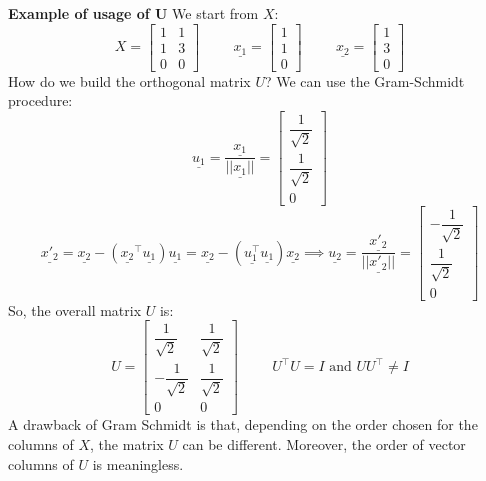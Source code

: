 \textbf{Example of usage of U}
We start from $X$:
\[
    X= \begin{bmatrix}
        1& 1 \\
        1 & 3\\
        0 & 0
    \end{bmatrix}
    \hspace{1cm}
    \underline{x_1} = \begin{bmatrix}
        1\\
        1\\
        0   
    \end{bmatrix}
    \hspace{1cm}
    \underline{x_2} = \begin{bmatrix}
        1\\
        3\\
        0
    \end{bmatrix}
\]
How do we build the orthogonal matrix $U$? We can use the Gram-Schmidt procedure:
\[
    \underline{u_1} = \dfrac{\underline{x_1}}{||\underline{x_1}||} = \begin{bmatrix}
        \dfrac{1}{\sqrt{2}}\\
        \dfrac{1}{\sqrt{2}}\\
        0
    \end{bmatrix}    
\]
\[
    \underline{{x'}_2} = \underline{x_2} - (\underline{x_2}^\intercal \underline{u_1})\underline{u_1} = \underline{x_2} - (\underline{u_1^\intercal} \underline{u_1})\underline{x_2} \implies 
    \underline{u_2} = \dfrac{\underline{{x'}_2}}{||\underline{{x'}_2}||} 
    = \begin{bmatrix}
        -\dfrac{1}{\sqrt{2}}\\
        \dfrac{1}{\sqrt{2}}\\
        0
    \end{bmatrix}    
\]
So, the overall matrix $U$ is:
\[
    U = \begin{bmatrix}
        \dfrac{1}{\sqrt{2}} & \dfrac{1}{\sqrt{2}}\\
        -\dfrac{1}{\sqrt{2}} & \dfrac{1}{\sqrt{2}}\\
        0 & 0
    \end{bmatrix}    \hspace{1cm}
    U^\intercal U = I \text{ and } UU^\intercal \neq I
\]
A drawback of Gram Schmidt is that, depending on the order chosen for the columns of $X$, the matrix $U$ can be different. Moreover, the order of vector columns of $U$ is meaningless. \\

